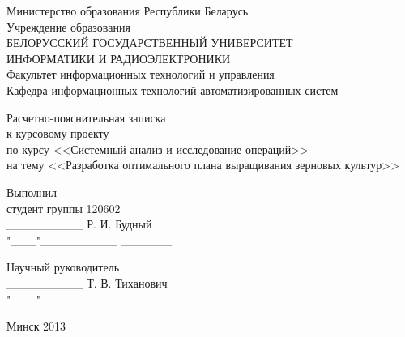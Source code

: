 \thispagestyle{empty}

\begin{center}
  Министерство образования Республики Беларусь \\
  \vspace{0.5ex}
  Учреждение образования \\
  БЕЛОРУССКИЙ ГОСУДАРСТВЕННЫЙ УНИВЕРСИТЕТ \\
  ИНФОРМАТИКИ И РАДИОЭЛЕКТРОНИКИ \\
  \vspace{0.5ex}
  Факультет информационных технологий и управления \\
  \vspace{0.5ex}
  Кафедра информационных технологий автоматизированных систем \\
\end{center}

\vspace{40mm}

\begin{center}
  Расчетно-пояснительная записка \\
  к курсовому проекту \\
  по курсу <<Системный анализ и исследование операций>> \\
  на тему <<Разработка оптимального плана выращивания зерновых культур>> \\
\end{center}

\vspace{20mm}

\begin{multicols}{2}\columnsep=500mm
  \begin{flushleft}
    Выполнил \\
    студент группы 120602 \\
    \_\_\_\_\_\_\_\_\_  Р. И. Будный \\
    "\_\_\_"\_\_\_\_\_\_\_\_\_ \_\_\_\_\_\_
  \end{flushleft}
  \columnbreak
  \begin{flushright}
    Научный руководитель \\
    \_\_\_\_\_\_\_\_\_  Т. В. Тиханович \\
    "\_\_\_"\_\_\_\_\_\_\_\_\_ \_\_\_\_\_\_
  \end{flushright}
\end{multicols}

\vspace{70mm}
\begin{center}
Минск 2013
\end{center}

\newpage
